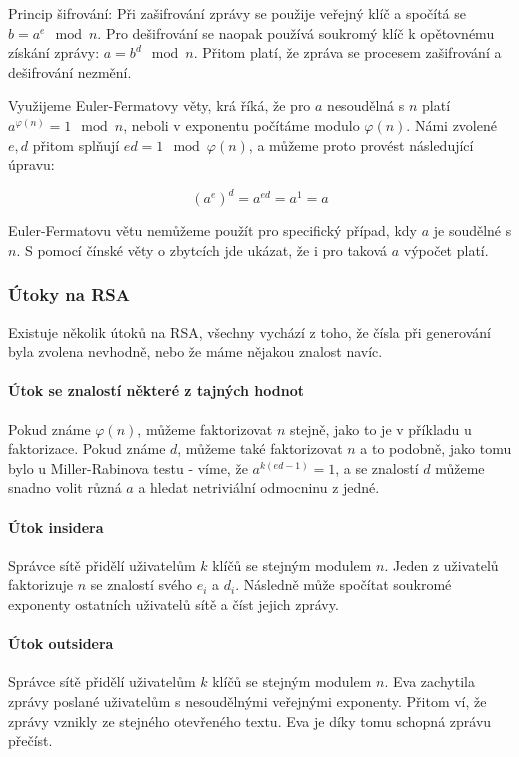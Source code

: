 \documentclass[10pt,a4paper]{article}
\begin{document}
Princip šifrování: Při zašifrování zprávy se použije veřejný klíč a spočítá se
$b = a^e \mod n$. Pro dešifrování se naopak používá soukromý klíč k opětovnému
získání zprávy: $a = b^d \mod n$. Přitom platí, že zpráva se procesem
zašifrování a dešifrování nezmění.

Využijeme Euler-Fermatovy věty, krá říká, že pro $a$ nesoudělná s $n$ platí
$a^{\varphi(n)} = 1 \mod n$, neboli v exponentu počítáme modulo $\varphi(n)$.
Námi zvolené $e, d$ přitom splňují $ed = 1 \mod \varphi(n)$, a můžeme proto
provést následující úpravu:

$$(a^e)^d = a^{ed} = a^1 = a$$

Euler-Fermatovu větu nemůžeme použít pro specifický případ, kdy $a$ je soudělné
s $n$. S pomocí čínské věty o zbytcích jde ukázat, že i pro taková $a$ výpočet
platí.

\subsubsection{Útoky na RSA}
Existuje několik útoků na RSA, všechny vychází z toho, že čísla při generování
byla zvolena nevhodně, nebo že máme nějakou znalost navíc.

\paragraph{Útok se znalostí některé z tajných hodnot}
Pokud známe $\varphi(n)$, můžeme faktorizovat $n$ stejně, jako to je v příkladu
u faktorizace. Pokud známe $d$, můžeme také faktorizovat $n$ a to podobně, jako
tomu bylo u Miller-Rabinova testu - víme, že $a^{k(ed - 1)} = 1$, a se znalostí
$d$ můžeme snadno volit různá $a$ a hledat netriviální odmocninu z jedné.

\paragraph{Útok insidera}
Správce sítě přidělí uživatelům $k$ klíčů se stejným modulem $n$. Jeden z
uživatelů faktorizuje $n$ se znalostí svého $e_i$ a $d_i$. Následně může
spočítat soukromé exponenty ostatních uživatelů sítě a číst jejich zprávy.

\paragraph{Útok outsidera}
Správce sítě přidělí uživatelům $k$ klíčů se stejným modulem $n$. Eva zachytila
zprávy poslané uživatelům s nesoudělnými veřejnými exponenty. Přitom ví, že
zprávy vznikly ze stejného otevřeného textu. Eva je díky tomu schopná zprávu
přečíst.
\end{document}
